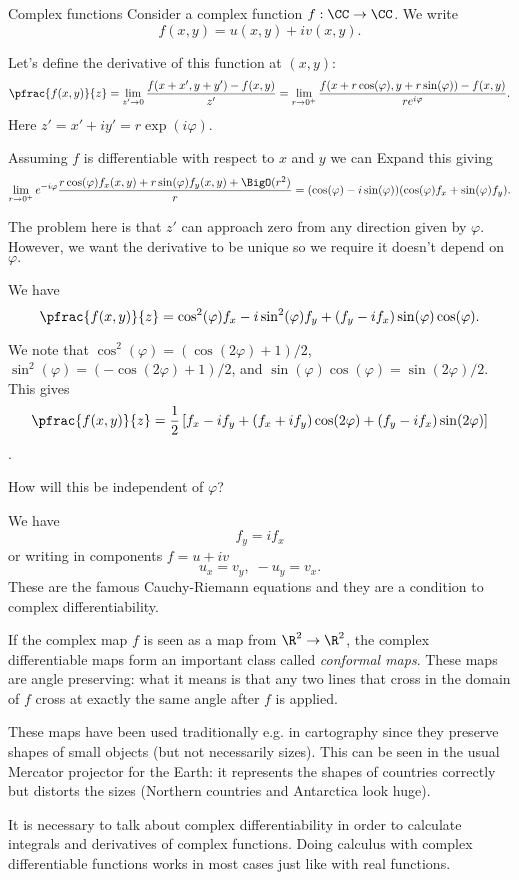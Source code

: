 \begin{frame}{Complex functions}
	Consider a complex function $ f: \CC \to \CC $. We write
	\[ f(x,y) = u(x,y) + i v(x,y). \]
	
	\pause
	Let's define the derivative of this function at $ (x,y) $:
	\[ \pfrac{f(x,y)}{z} = \lim_{z'\to 0} \frac{f(x+x',y+y')-f(x,y)}{z'} = \lim_{r \to 0^+} \frac{f(x+r \cos(\varphi),y+r\sin(\varphi))-f(x,y)}{r e^{i\varphi}}. \]
	Here $ z' = x' + iy' = r \exp(i\varphi) $.  
	
	\pause
	Assuming $ f $ is differentiable with respect to $ x $ and $ y $ we can Expand this giving
	\[ \lim_{r \to 0^+} e^{-i\varphi}\frac{r\cos(\varphi)f_x(x,y) + r\sin(\varphi) f_y(x,y) + \BigO(r^2)}{r } = (\cos(\varphi) - i\sin(\varphi))(\cos(\varphi) f_x + \sin(\varphi) f_y). \]
	
	\pause
	The problem here is that $ z' $ can approach zero from any direction given by $ \varphi $. However, we want the derivative to be unique so we require it doesn't depend on $ \varphi. $
\end{frame}

\begin{frame}
	We have 
	\[ \pfrac{f(x,y)}{z} = \cos^2(\varphi) f_x - i \sin^2(\varphi) f_y + (f_y -i f_x )\sin(\varphi)\cos(\varphi). \]
	
	\pause
	We note that $ \cos^2(\varphi) = (\cos(2\varphi)+1)/2 $, $ \sin^2(\varphi) = (-\cos(2\varphi)+1)/2 $, and $ \sin(\varphi)\cos(\varphi) = \sin(2\varphi)/2 $. This gives
	\[ \pfrac{f(x,y)}{z} = \frac{1}{2} \left[f_x - i f_y + (f_x + i f_y)\cos(2\varphi) 
	+ (f_y - if_x) \sin(2\varphi)
	\right]\].
	
	\pause
	How will this be independent of $ \varphi $?
	
	\pause
	We have 
	\[ f_y = i f_x \]
	or writing in components $ f = u + iv $
	\[ u_x = v_y, \; -u_y = v_x. \]
	These are the famous Cauchy-Riemann equations and they are a condition to complex differentiability. 
\end{frame}

\begin{frame}
	
	{\color{olive} If the complex map $ f $ is seen as a map from $ \R^2 \to \R^2 $, the complex differentiable maps form an important class called \emph{conformal maps}. These maps are angle preserving: what it means is that any two lines that cross in the domain of $ f $ cross at exactly the same angle after $ f $ is applied. 
	
	\pause	
	These maps have been used traditionally e.g. in cartography since they preserve shapes of small objects (but not necessarily sizes). This can be seen in the usual Mercator projector for the Earth: it represents the shapes of countries correctly but distorts the sizes (Northern countries and Antarctica look huge). }

	\pause
	It is necessary to talk about complex differentiability in order to calculate integrals and derivatives of complex functions. Doing calculus with complex differentiable functions works in most cases just like with real functions.
\end{frame}

